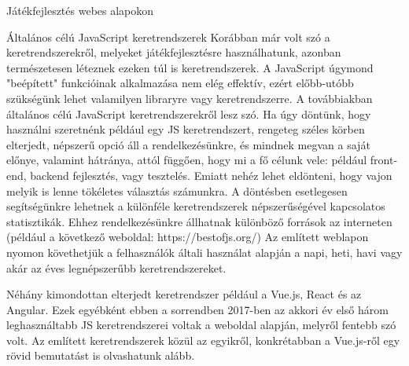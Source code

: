 \begin{MyChapter}{Játékfejlesztés webes alapokon}
	\begin{MySection}{Általános célú JavaScript keretrendszerek}
		Korábban már volt szó a keretrendszerekről, melyeket játékfejlesztésre használhatunk, azonban természetesen léteznek ezeken túl is keretrendszerek. A JavaScript úgymond "beépített" funkcióinak alkalmazása nem elég effektív, ezért előbb-utóbb szükségünk lehet valamilyen libraryre vagy keretrendszerre. A továbbiakban általános célú JavaScript keretrendszerekről lesz szó.
		Ha úgy döntünk, hogy használni szeretnénk például egy JS keretrendszert, rengeteg széles körben elterjedt, népszerű opció áll a rendelkezésünkre, és mindnek megvan a saját előnye, valamint hátránya, attól függően, hogy mi a fő célunk vele: például front-end, backend fejlesztés, vagy tesztelés. Emiatt nehéz lehet eldönteni, hogy vajon melyik is lenne tökéletes választás számunkra. A döntésben esetlegesen segítségünkre lehetnek a különféle keretrendszerek népszerűségével kapcsolatos statisztikák. Ehhez rendelkezésünkre állhatnak különböző források az interneten (például a következő weboldal: https://bestofjs.org/)
		Az említett weblapon nyomon követhetjük a felhasználók általi használat alapján a napi, heti, havi vagy akár az éves legnépszerűbb keretrendszereket.
		
		Néhány kimondottan elterjedt keretrendszer például a Vue.js, React és az Angular. Ezek egyébként ebben a sorrendben 2017-ben az akkori év első három leghasználtabb JS keretrendszerei voltak a weboldal alapján, melyről fentebb szó volt.
		Az említett keretrendszerek közül az egyikről, konkrétabban a Vue.js-ről egy rövid bemutatást is olvashatunk alább.
		

\end{MySection}
\end{MyChapter}
